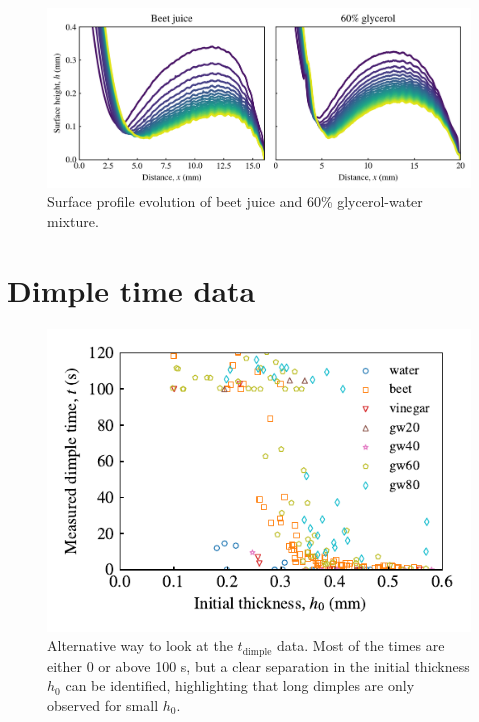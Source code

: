 \documentclass[aps,prfluids,amsmath,amssymb,superscriptaddress,longbibliography]{revtex4-2}
\newif\ifhighlight
\newcommand{\hl}[1]{\ifhighlight\textcolor{blue}{#1}\else#1\fi}
\begin{document}
\begin{figure}[ht]
    \centering
    \includegraphics[width=.8\linewidth]{Figures/beet_and_gw.png}
    \caption{
    \hl{Surface profile evolution of beet juice and 60\% glycerol-water mixture.}
    }
    \label{fig:marangoni}
\end{figure}

\newpage

\section{Dimple time data}\label{app:all-dimple-time-data}

\begin{figure}[ht]
    \centering
    \includegraphics[width=.5\linewidth]{Figures/all_dimple_time_data}
    \caption{
    Alternative way to look at the $t_{\mathrm{dimple}}$ data. Most of the times are either 0 or above 100 s, but a clear separation in the initial thickness $h_0$ can be identified, highlighting that long dimples are only observed for small $h_0$.
    }
    \label{fig:all-dimple-time-data}
\end{figure}



\end{document}
